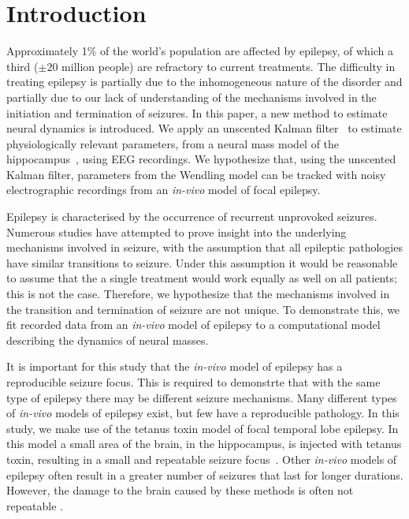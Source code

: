 \section{Introduction}


Approximately 1\% of the world's population are affected by epilepsy, of which a third ($\pm20$ million people) are refractory to current treatments. The difficulty in treating epilepsy is partially due to the inhomogeneous nature of the disorder and partially due to our lack of understanding of the mechanisms involved in the initiation and termination of seizures. In this paper, a new method to estimate neural dynamics is introduced. We apply an unscented Kalman filter~\citep{voss2004nonlinear} to estimate physiologically relevant parameters, from a neural mass model of the hippocampus~\citep{wendling2002epileptic}, using EEG recordings. We hypothesize that, using the unscented Kalman filter, parameters from the Wendling model can be tracked with noisy electrographic recordings from an \textsl{in-vivo} model of focal epilepsy.

Epilepsy is characterised by the occurrence of recurrent unprovoked seizures. Numerous studies have attempted to prove insight into the underlying mechanisms involved in seizure, with the assumption that all epileptic pathologies have similar transitions to seizure. Under this assumption it would be reasonable to assume that the a single treatment would work equally as well on all patients; this is not the case. Therefore, we hypothesize that the mechanisms involved in the transition and termination of seizure are not unique. To demonstrate this, we fit recorded data from an \textsl{in-vivo} model of epilepsy to a computational model describing the dynamics of neural masses.


It is important for this study that the \textsl{in-vivo} model of epilepsy has a reproducible seizure focus. This is required to demonstrte that with the same type of epilepsy there may be different seizure mechanisms. Many different types of \textsl{in-vivo} models of epilepsy exist, but few have a reproducible pathology. In this study, we make use of the tetanus toxin model of focal temporal lobe epilepsy. In this model a small area of the brain, in the hippocampus, is injected with tetanus toxin, resulting in a small and repeatable seizure focus~\citep{jefferys1995chronic}. Other \textsl{in-vivo} models of epilepsy often result in a greater number of seizures that last for longer durations. However, the damage to the brain caused by these methods is often not repeatable .  

